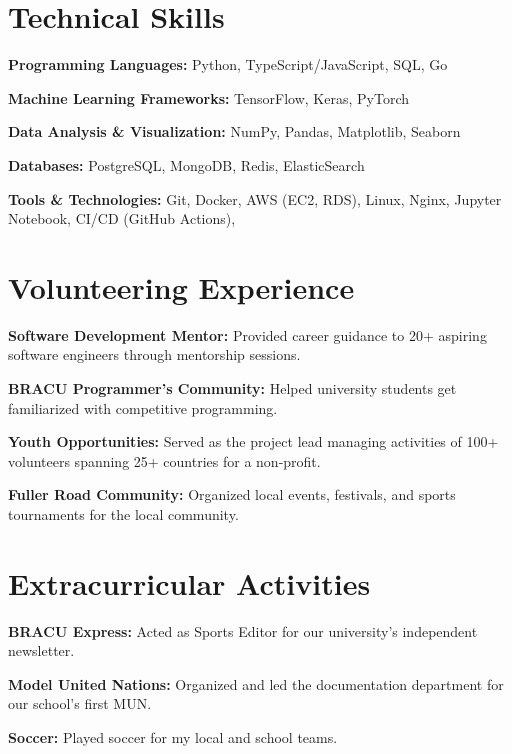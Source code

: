 \documentclass[]{resume-openfont}
\begin{document}
\section{Technical Skills}
\sectionsep
\begin{bullets}
    \item \textbf{Programming Languages:} Python, TypeScript/JavaScript, SQL, Go
    \item \textbf{Machine Learning Frameworks:} TensorFlow, Keras, PyTorch
    \item \textbf{Data Analysis \& Visualization:}  NumPy, Pandas, Matplotlib, Seaborn
    \item \textbf{Databases:} PostgreSQL, MongoDB, Redis, ElasticSearch
    \item \textbf{Tools \& Technologies:} Git, Docker, AWS (EC2, RDS), Linux, Nginx, Jupyter Notebook, CI/CD (GitHub Actions),
\end{bullets}
\sectionsep

\section{Volunteering Experience}
\sectionsep
\begin{bullets}
\item \textbf{Software Development Mentor:} Provided career guidance to 20+ aspiring software engineers through mentorship sessions.
\item \textbf{BRACU Programmer's Community:} Helped university students get familiarized with competitive programming.
\item \textbf{Youth Opportunities:} Served as the project lead managing activities of 100+ volunteers spanning 25+ countries for a non-profit.
\item \textbf{Fuller Road Community:} Organized local events, festivals, and sports tournaments for the local community.
\end{bullets}
\sectionsep
\section{Extracurricular Activities}
\sectionsep
\begin{bullets}
    \item \textbf{BRACU Express:} Acted as Sports Editor for our university's independent newsletter.
    \item \textbf{Model United Nations:} Organized and led the documentation department for our school's first MUN.
    \item \textbf{Soccer:} Played soccer for my local and school teams.
\end{bullets}
\sectionsep
\end{document}
